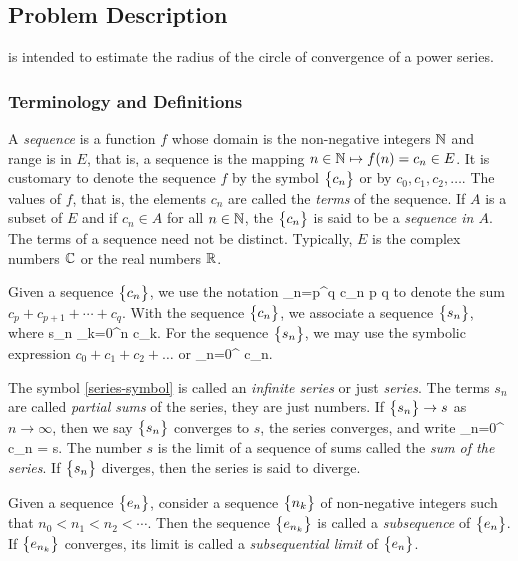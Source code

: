 \documentclass[12pt]{article}
\begin{document}
\subsection{Problem Description} \label{Sec_pd}

 is intended to estimate the radius of the circle of convergence of a power series.

\subsubsection{Terminology and  Definitions}\label{ssc:terminology-definitions}

A {\it sequence} is a function $f$ whose domain is the non-negative integers $\mathbb{N}$
and range is in $E$, that is, a sequence is the mapping $n \in \mathbb{N} \mapsto f(n) = c_n \in E$. It is customary
to denote the sequence $f$ by the symbol $\bigl\{ {c_n} \bigr\}$ or by $c_0, c_1, c_2, \ldots$.
The values of $f$, that is, the elements $c_n$ are called the {\it terms} of the sequence.
If $A$ is a subset of $E$ and if $c_n \in A$ for all $n \in \mathbb{N}$, the $\bigl\{ {c_n} \bigr\}$ is said to be
a {\it sequence in $A$}. The terms of a sequence need not be distinct. Typically, $E$ is
the complex numbers $\mathbb{C}$ or the real numbers $\mathbb{R}$.

Given a sequence $\bigl\{ {c_n} \bigr\}$, we use the notation
\EQ
{
  \sum_{n=p}^q c_n \qquad{}\qquad p \leq q
}
to denote the sum $c_p + c_{p+1} + \cdots + c_q$. With the sequence $\bigl\{ {c_n} \bigr\}$, we associate a sequence
$\bigl\{ {s_n} \bigr\}$, where
\EQ
{
  \label{eq:partial-sum}
  s_n  \sum_{k=0}^n c_k.
}
For the sequence $\bigl\{ {s_n} \bigr\}$, we may use the symbolic expression $c_0 + c_1 + c_2 + \ldots$ or
\EQ
{
  \label{eq:series-symbol}
  \sum_{n=0}^{\infty} c_n.
}

The symbol \eqref{series-symbol} is called an {\it infinite series} or just {\it series}. The
terms $s_n$ are called {\it partial sums} of the series, they are just numbers.
If $\bigl\{ {s_n} \bigr\} \rightarrow s$ as $n \rightarrow \infty$, then we say $\bigl\{ {s_n} \bigr\}$ converges to $s$,
the series converges, and write
\EQ
{
  \label{eq:series-limit}
  \sum_{n=0}^{\infty} c_n = s.
}
The number $s$ is the limit of a sequence of sums called the {\it sum of the series}. If $\bigl\{ {s_n} \bigr\}$
diverges, then the series is said to diverge.

Given a sequence $\bigl\{ {e_n} \bigr\}$, consider a sequence $\bigl\{ {n_k} \bigr\}$ of non-negative integers such that
$n_0 < n_1 < n_2 < \cdots$. Then the sequence $\bigl\{ {e_{n_k}} \bigr\}$ is called a {\it subsequence} of
$\bigl\{ {e_n} \bigr\}$. If $\bigl\{ {e_{n_k}} \bigr\}$ converges, its limit is called a {\it subsequential limit} of $\bigl\{ {e_n} \bigr\}$.
\end{document}
